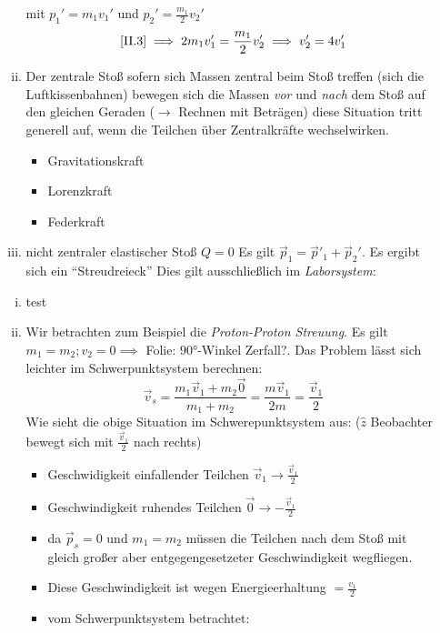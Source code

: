 \documentclass[a4paper,10pt]{scrartcl}
\begin{document}
\begin{sg}
\begin{enumerate}[a]
\begin{enumerate}[(i)]
mit $p_1'=m_1 v_1'$ und $p_2'=\frac{m_1}{2} v_2'$
\[
 \ref{II.3} \implies 2m_1 v_1'= \frac{m_1}{2} v_2' \implies v_2'=4 v_1'
\]
\item \begin{seg}{Der zentrale Stoß}
sofern sich Massen zentral beim Stoß treffen (sich die Luftkissenbahnen) bewegen sich die Massen \emph{vor} und \emph{nach} dem Stoß auf den gleichen Geraden ($\to$ Rechnen mit Beträgen) diese Situation tritt generell auf, wenn die Teilchen über Zentralkräfte wechselwirken.
\end{seg}
\begin{exs*}
 \begin{itemize}
  \item Gravitationskraft
  \item Lorenzkraft
  \item Federkraft
 \end{itemize}
\end{exs*}
\item nicht zentraler elastischer Stoß $Q=0$
Es gilt $\vec p_1=\vec p'_1+ \vec p_2'$. Es ergibt sich ein "`Streudreieck"'
Dies gilt ausschließlich im \emph{Laborsystem}:
\end{enumerate}
\begin{enumerate}[(i)]
\item test
\item \begin{sg}
Wir betrachten zum Beispiel die \emph{Proton-Proton Streuung}. 
Es gilt $m_1=m_2; v_2=0 \implies $ Folie: $90°$-Winkel Zerfall?.
Das Problem lässt sich leichter im Schwerpunktsystem berechnen:
\[
 \vec v_s=\frac{m_1\vec v_1+ m_2 \vec 0}{m_1+m_2}= \frac{m\vec{v}_1}{2m}=\frac{\vec v_1}{2}
\]
Wie sieht die obige Situation im Schwerepunktsystem aus:
($\hat z$ Beobachter bewegt sich mit $\frac{\vec v_1}{2}$ nach rechts)
\end{sg}
\begin{itemize}
 \item Geschwidigkeit einfallender Teilchen $\vec v_1 \to \frac{\vec v_1}{2}$
 \item Geschwindigkeit ruhendes Teilchen $\vec 0 \to - \frac{\vec v_1}{2}$
 \item da $\vec p_s=0$ und $m_1=m_2$ müssen die Teilchen nach dem Stoß mit gleich großer aber entgegengesetzeter Geschwindigkeit wegfliegen.
 \item Diese Geschwindigkeit ist wegen Energieerhaltung $=\frac{v_1}{2}$
 \item vom Schwerpunktsystem betrachtet:\\

\end{itemize}
\end{enumerate}
\end{enumerate}
\end{sg}
\end{document}
